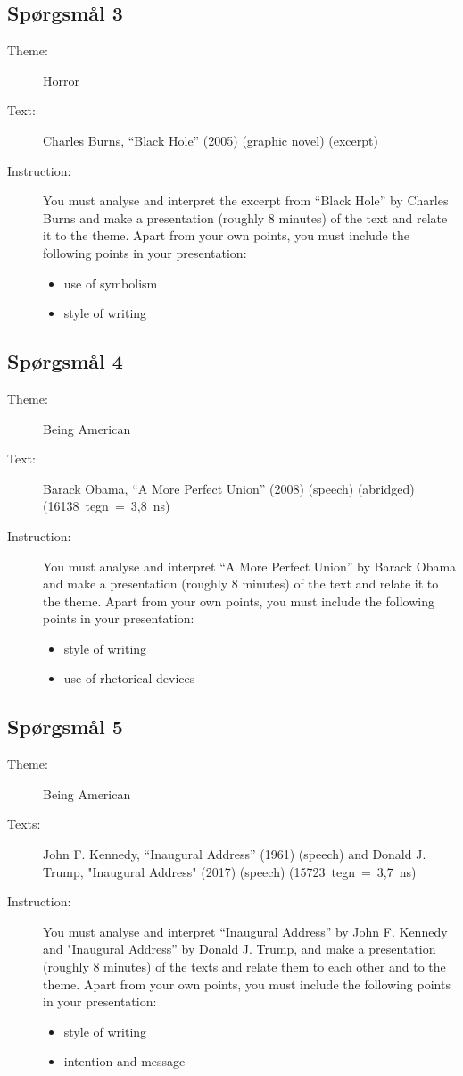 \documentclass[10pt,a4paper]{article}
\begin{document}
\subsection{Spørgsmål 3}
\begin{description}
\item[Theme:] Horror
\item[Text:] Charles Burns, “Black Hole” (2005) (graphic novel) (excerpt)
\item[Instruction:] You must analyse and interpret the excerpt from “Black Hole” by Charles Burns and make a presentation (roughly 8 minutes) of the text and relate it to the theme. Apart from your own points, you must include the following points in your presentation:
\begin{itemize}
\item use of symbolism 
\item style of writing
\end{itemize}
\end{description}

\subsection{Spørgsmål 4}
\begin{description}
\item[Theme:] Being American
\item[Text:] Barack Obama, “A More Perfect Union” (2008) (speech) (abridged) (16138~tegn~=~3,8~ns)
\item[Instruction:] You must analyse and interpret “A More Perfect Union” by Barack Obama and make a presentation (roughly 8 minutes) of the text and relate it to the theme. Apart from your own points, you must include the following points in your presentation:
\begin{itemize}
\item style of writing
\item use of rhetorical devices
\end{itemize}
\end{description}

\subsection{Spørgsmål 5}
\begin{description}
\item[Theme:] Being American
\item[Texts:] John F. Kennedy, “Inaugural Address” (1961) (speech) and Donald J. Trump, "Inaugural Address" (2017) (speech) (15723~tegn~=~3,7~ns)
\item[Instruction:] You must analyse and interpret “Inaugural Address” by John F. Kennedy and "Inaugural Address” by Donald J. Trump, and make a presentation (roughly 8 minutes) of the texts and relate them to each other and to the theme. Apart from your own points, you must include the following points in your presentation:
\begin{itemize}
\item style of writing
\item intention and message
\end{itemize}
\end{description}
\end{document}
